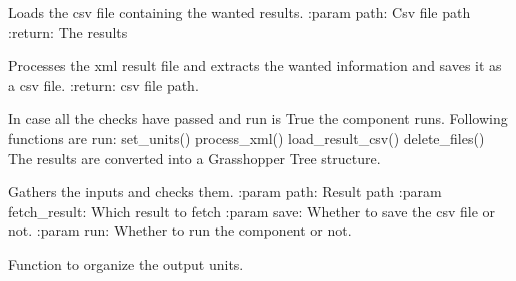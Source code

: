 \documentclass[letterpaper,10pt,english]{sphinxmanual}
\begin{document}
\begin{fulllineitems}
\begin{fulllineitems}
\end{fulllineitems}


\begin{fulllineitems}
\label{\detokenize{cmf:livestock.components.comp_cmf.CMFResults.load_result_csv}}
Loads the csv file containing the wanted results.
:param path: Csv file path
:return: The results

\end{fulllineitems}


\begin{fulllineitems}
\label{\detokenize{cmf:livestock.components.comp_cmf.CMFResults.process_xml}}
Processes the xml result file and extracts the wanted information and saves it as a csv file.
:return: csv file path.

\end{fulllineitems}


\begin{fulllineitems}
\label{\detokenize{cmf:livestock.components.comp_cmf.CMFResults.run}}
In case all the checks have passed and run is True the component runs.
Following functions are run:
set\_units()
process\_xml()
load\_result\_csv()
delete\_files()
The results are converted into a Grasshopper Tree structure.

\end{fulllineitems}


\begin{fulllineitems}
\label{\detokenize{cmf:livestock.components.comp_cmf.CMFResults.run_checks}}
Gathers the inputs and checks them.
:param path: Result path
:param fetch\_result: Which result to fetch
:param save: Whether to save the csv file or not.
:param run: Whether to run the component or not.

\end{fulllineitems}


\begin{fulllineitems}
\label{\detokenize{cmf:livestock.components.comp_cmf.CMFResults.set_units}}
Function to organize the output units.

\end{fulllineitems}


\end{fulllineitems}
\end{document}
